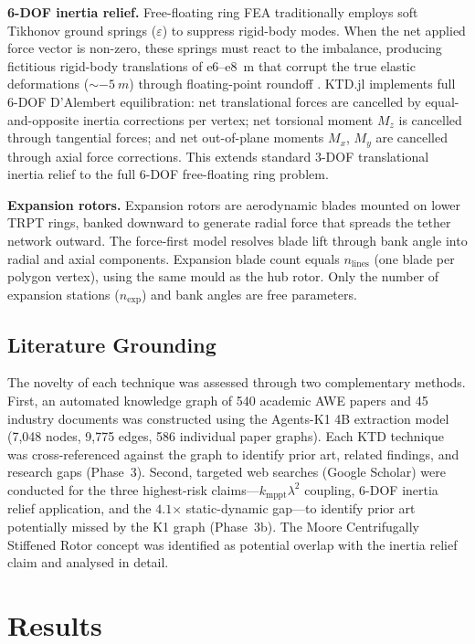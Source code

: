 \documentclass[11pt,a4paper]{article}
\begin{document}
\textbf{6-DOF inertia relief.} Free-floating ring FEA traditionally employs soft Tikhonov ground springs ($\varepsilon$) to suppress rigid-body modes. When the net applied force vector is non-zero, these springs must react to the imbalance, producing fictitious rigid-body translations of e6--e8~m that corrupt the true elastic deformations ($\sim-5~m$) through floating-point roundoff \cite{adr0001}. KTD.jl implements full 6-DOF D'Alembert equilibration: net translational forces are cancelled by equal-and-opposite inertia corrections per vertex; net torsional moment $M_z$ is cancelled through tangential forces; and net out-of-plane moments $M_x$, $M_y$ are cancelled through axial force corrections. This extends standard 3-DOF translational inertia relief \cite{nasa1995} to the full 6-DOF free-floating ring problem.

\textbf{Expansion rotors.} Expansion rotors are aerodynamic blades mounted on lower TRPT rings, banked downward to generate radial force that spreads the tether network outward. The force-first model resolves blade lift through bank angle into radial and axial components. Expansion blade count equals $n_{\mathrm{lines}}$ (one blade per polygon vertex), using the same mould as the hub rotor. Only the number of expansion stations ($n_{\mathrm{exp}}$) and bank angles are free parameters.

\subsection{Literature Grounding}

The novelty of each technique was assessed through two complementary methods. First, an automated knowledge graph of 540 academic AWE papers and 45 industry documents was constructed using the Agents-K1 4B extraction model (7,048 nodes, 9,775 edges, 586 individual paper graphs). Each KTD technique was cross-referenced against the graph to identify prior art, related findings, and research gaps (Phase~3). Second, targeted web searches (Google Scholar) were conducted for the three highest-risk claims—$k_{\mathrm{mppt}} \lambda^2$ coupling, 6-DOF inertia relief application, and the $4.1$$\times$ static-dynamic gap—to identify prior art potentially missed by the K1 graph (Phase~3b). The Moore Centrifugally Stiffened Rotor concept \cite{moore2014} was identified as potential overlap with the inertia relief claim and analysed in detail.

\section{Results}
\end{document}
